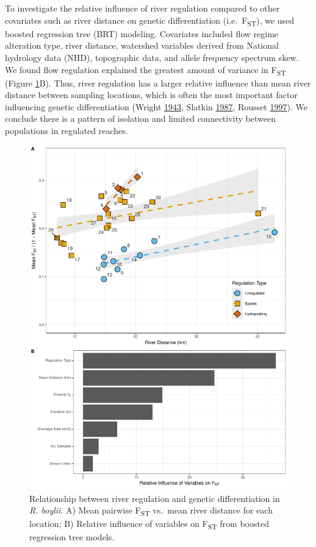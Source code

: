 \documentclass[twoside,12pt,final]{ucthesis-CA2012} %
\begin{document}
\begin{ucmainmatter}
To investigate the relative influence of river regulation compared to
other covariates such as river distance on genetic differentiation
(i.e.~F\textsubscript{ST}), we used boosted regression tree (BRT)
modeling. Covariates included flow regime alteration type, river
distance, watershed variables derived from National hydrology data
(NHD), topographic data, and allele frequency spectrum skew. We found
flow regulation explained the greatest amount of variance in
F\textsubscript{ST} (Figure \ref{fig:CH1F3fst}B). Thus, river regulation
has a larger relative influence than mean river distance between
sampling locations, which is often the most important factor influencing
genetic differentiation (Wright
\protect\hyperlink{ref-wright_isolation_1943}{1943}, Slatkin
\protect\hyperlink{ref-slatkin_gene_1987}{1987}, Rousset
\protect\hyperlink{ref-rousset_genetic_1997}{1997}). We conclude there
is a pattern of isolation and limited connectivity between populations
in regulated reaches.






\begin{figure}
\includegraphics[height=0.6\textheight]{figure/ch1/fig_03ab_fst_brt_cowplot_for_phd} \caption{Relationship between river regulation and genetic
differentiation in \emph{R. boylii}. A) Mean pairwise
F\textsubscript{ST} vs.~mean river distance for each location; B)
Relative influence of variables on F\textsubscript{ST} from boosted
regression tree models.}\label{fig:CH1F3fst}
\end{figure}
\clearpage


\end{ucmainmatter}
\end{document}
